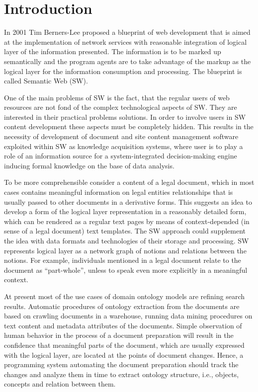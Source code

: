 \documentclass[conference]{IEEEtran}
\begin{document}
\section{Introduction}
In 2001 Tim Berners-Lee proposed a blueprint \cite{TBL2001} of web development that is aimed at the implementation of network services with reasonable integration of logical layer of the information presented.  The information is to be marked up semantically and the program agents are to take advantage of the markup as the logical layer for the information consumption and processing.  The blueprint is called Semantic Web (SW).

One of the main problems of SW is the fact, that the regular users of web resources are not fond of the complex technological aspects of SW. They are interested in their practical problems solutions.  In order to involve users in SW content development these aspects must be completely hidden.  This results in the necessity of development of document and site content management software exploited within SW as knowledge acquisition systems, where user is to play a role of an information source for a system-integrated decision-making engine inducing formal knowledge on the base of data analysis.

To be more comprehensible consider a content of a legal document, which in most cases contains meaningful information on legal entities relationships that is usually passed to other documents in a derivative forms.  This suggests an idea to develop a form of the logical layer representation in a reasonably detailed form, which can be rendered as a regular text pages by means of context-depended (in sense of a legal document) text templates.  The SW approach could supplement the idea with data formats and technologies of their storage and processing.  SW represents logical layer as a network graph of notions and relations between the notions.  For example, individuals mentioned in a legal document relate to the document as ``part-whole'', unless to speak even more explicitly in a meaningful context.

At present most of the use cases of domain ontology models are
refining search results.  Automatic procedures of ontology extraction
from the documents are based on crawling documents in a warehouse,
running data mining procedures on text content and metadata
attributes of the documents.  Simple observation of human behavior
in the process of a document preparation will result in the confidence
that meaningful parts of the document, which are usually expressed
with the logical layer, are located at the points of document changes.
Hence, a programming system automating the document preparation should
track the changes and analyze them in time to extract ontology structure,
i.e., objects, concepts and relation between them.
\end{document}
